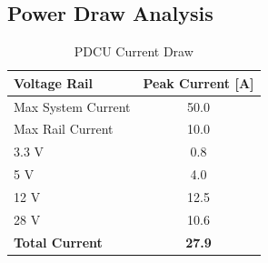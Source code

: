 \documentclass[a4paper, 11pt, conference]{IEEEtran}
\begin{document}
\clearpage

\subsection{Power Draw Analysis}

\begin{table}[H]
\centering
\caption{PDCU Current Draw}
\label{tab:power_draw}
\begin{tabular}{lc}
\toprule
\textbf{Voltage Rail} & \textbf{Peak Current [A]} \\
\midrule
Max System Current & 50.0 \\
Max Rail Current & 10.0 \\
\midrule
3.3 V & 0.8 \\
5 V & 4.0 \\
12 V & 12.5 \\
28 V & 10.6 \\
\midrule
\textbf{Total Current} & \textbf{27.9} \\
\bottomrule
\end{tabular}
\end{table}
\end{document}
